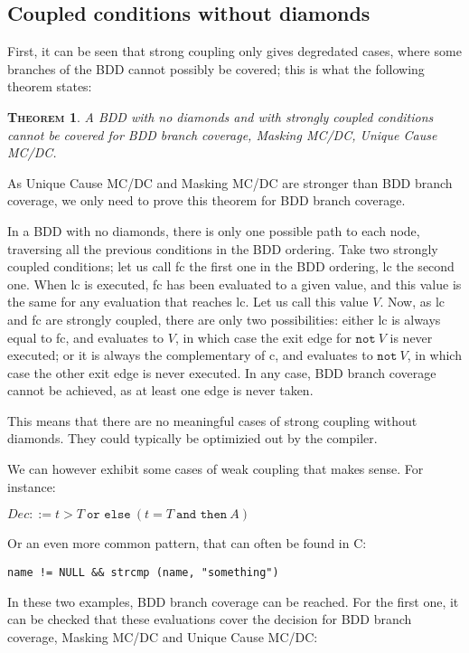 \documentclass[a4paper,12pt,twoside]{article}
\newcommand{\andthen}{\texttt{and then}}
\newcommand{\orelse}{\texttt{or else}}
\newcommand{\adanot}{\texttt{not}}
\newtheorem{theorem}{\textsc{Theorem}}
\begin{document}
\subsection{Coupled conditions without diamonds}

First, it can be seen that strong coupling only gives degredated cases,
where some branches of the BDD cannot possibly be covered; this is
what the following theorem states:

\begin{theorem}
  \label{thm:strong-coupling-no-diamond}
  A BDD with no diamonds and with strongly coupled conditions cannot be
  covered for BDD branch coverage, Masking MC/DC, Unique Cause MC/DC.
\end{theorem}

As Unique Cause MC/DC and Masking MC/DC are stronger than BDD branch
coverage, we only need to prove this theorem for BDD branch coverage.

In a BDD with no diamonds, there is only one possible path to each
node, traversing all the previous conditions in the BDD ordering. Take
two strongly coupled conditions; let us call fc the first one in the
BDD ordering, lc the second one. When lc is executed, fc has been
evaluated to a given value, and this value is the same for any
evaluation that reaches lc. Let us call this value $V$. Now, as lc and
fc are strongly coupled, there are only two possibilities: either lc
is always equal to fc, and evaluates to $V$, in which case the exit edge
for $\adanot{} \ V$ is never executed; or it is always the
complementary of c, and evaluates to $\adanot{} \ V$, in which case
the other exit edge is never executed. In any case, BDD branch
coverage cannot be achieved, as at least one edge is never taken.

This means that there are no meaningful cases of strong coupling
without diamonds. They could typically be optimizied out by the
compiler.

We can however exhibit some cases of weak coupling that makes sense.
For instance:

$Dec ::= t > T \ \orelse{} \ (t = T \ \andthen{} \ A)$

Or an even more common pattern, that can often be found in C:

\verb|name != NULL && strcmp (name, "something")|

In these two examples, BDD branch coverage can be reached. For the first
one, it can be checked that these evaluations cover the decision for
BDD branch coverage, Masking MC/DC and Unique Cause MC/DC:
\end{document}
